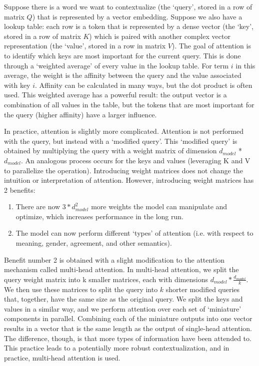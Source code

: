 Suppose there is a word we want to contextualize (the ‘query’, stored in a row of matrix $Q$) that is represented by a vector embedding. Suppose we also have a lookup table: each row is a token that is represented by a dense vector (the ‘key’, stored in a row of matrix $K$) which is paired with another complex vector representation (the ‘value’, stored in a row in matrix $V$). The goal of attention is to identify which keys are most important for the current query. This is done through a ‘weighted average’ of every value in the lookup table. For term $i$ in this average, the weight is the affinity between the query and the value associated with key $i$. Affinity can be calculated in many ways, but the dot product is often used. This weighted average has a powerful result: the output vector is a combination of all values in the table, but the tokens that are most important for the query (higher affinity) have a larger influence.

In practice, attention is slightly more complicated. Attention is not performed with the query, but instead with a ‘modified query’. This ‘modified query’ is obtained by multiplying the query with a weight matrix of dimension $d_{model}$ * $d_{model}$. An analogous process occurs for the keys and values (leveraging K and V to parallelize the operation). Introducing weight matrices does not change the intuition or interpretation of attention. However, introducing weight matrices has 2 benefits: 
\begin{enumerate}[itemsep=0mm, topsep=0mm]
  \item There are now $3 * d_{model}^2$ more weights the model can manipulate and optimize, which increases performance in the long run. 
  \item The model can now perform different ‘types’ of attention (i.e. with respect to meaning, gender, agreement, and other semantics).
\end{enumerate}

Benefit number 2 is obtained with a slight modification to the attention mechanism called multi-head attention. In multi-head attention, we split the query weight matrix into k smaller matrices, each with dimensions $d_{model} * \frac{d_{model}}{k}$. We then use these matrices to split the query into $k$ shorter modified queries that, together, have the same size as the original query. We split the keys and values in a similar way, and we perform attention over each set of ‘miniature’ components in parallel. Combining each of the miniature outputs into one vector results in a vector that is the same length as the output of single-head attention. The difference, though, is that more types of information have been attended to. This practice leads to a potentially more robust contextualization, and in practice, multi-head attention is used.

